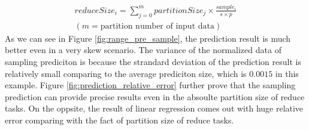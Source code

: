 \documentclass[10pt,twocolumn]{article}
\begin{document}
\begin{equation}
\label{equationsample} 
\begin{aligned}
	reduceSize_i = {\displaystyle\sum_{j=0}^{m} {partitionSize_j \times \frac{sample_i}{s \times p}}} \\ 
	{\left( m = \text{partition number of input data} \right)}
\end{aligned}
\end{equation}
As we can see in Figure \ref{fig:range_pre_sample}, the prediction result is much better even in a very skew scenario. The variance of the normalized data of sampling prediciton is because the strandard deviation of the prediction result is relatively small comparing to the average prediciton size, which is $0.0015$ in this example. Figure \ref{fig:prediction_relative_error} further prove that the sampling prediction can provide precise results even in the absoulte partition size of reduce tasks. On the oppsite, the result of linear regression comes out with huge relative error comparing with the fact of partition size of reduce tasks.
\end{document}
